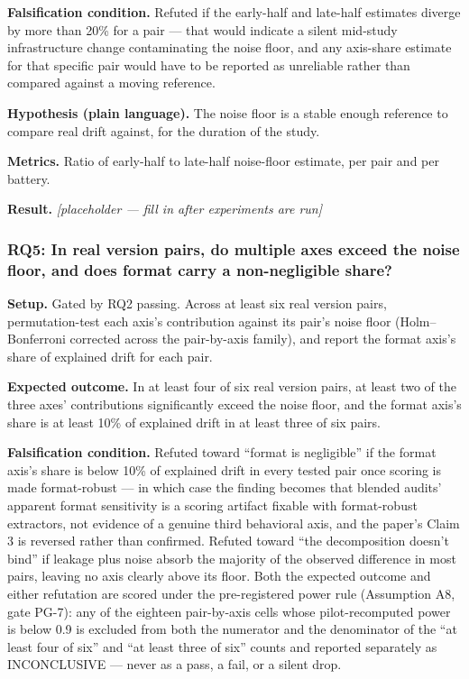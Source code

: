 \documentclass[11pt]{article}
\newcommand{\ph}{\textit{[placeholder --- fill in after experiments are run]}}
\begin{document}
\textbf{Falsification condition.} Refuted if the early-half and late-half estimates diverge by more than 20\% for a pair --- that would indicate a silent mid-study infrastructure change contaminating the noise floor, and any axis-share estimate for that specific pair would have to be reported as unreliable rather than compared against a moving reference.

\textbf{Hypothesis (plain language).} The noise floor is a stable enough reference to compare real drift against, for the duration of the study.

\textbf{Metrics.} Ratio of early-half to late-half noise-floor estimate, per pair and per battery.

\textbf{Result.} \ph

\subsubsection{RQ5: In real version pairs, do multiple axes exceed the noise floor, and does format carry a non-negligible share?}
\textbf{Setup.} Gated by RQ2 passing. Across at least six real version pairs, permutation-test each axis's contribution against its pair's noise floor (Holm--Bonferroni corrected across the pair-by-axis family), and report the format axis's share of explained drift for each pair.

\textbf{Expected outcome.} In at least four of six real version pairs, at least two of the three axes' contributions significantly exceed the noise floor, and the format axis's share is at least 10\% of explained drift in at least three of six pairs.

\textbf{Falsification condition.} Refuted toward ``format is negligible'' if the format axis's share is below 10\% of explained drift in every tested pair once scoring is made format-robust --- in which case the finding becomes that blended audits' apparent format sensitivity is a scoring artifact fixable with format-robust extractors, not evidence of a genuine third behavioral axis, and the paper's Claim 3 is reversed rather than confirmed. Refuted toward ``the decomposition doesn't bind'' if leakage plus noise absorb the majority of the observed difference in most pairs, leaving no axis clearly above its floor. Both the expected outcome and either refutation are scored under the pre-registered power rule (Assumption A8, gate PG-7): any of the eighteen pair-by-axis cells whose pilot-recomputed power is below 0.9 is excluded from both the numerator and the denominator of the ``at least four of six'' and ``at least three of six'' counts and reported separately as INCONCLUSIVE --- never as a pass, a fail, or a silent drop.
\end{document}

